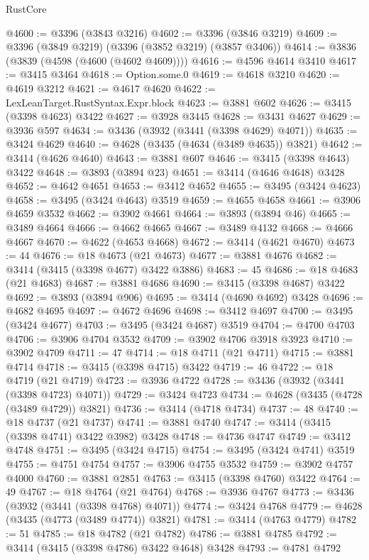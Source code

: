 \begin{lexlean}{RustCore}
\begin{coremodule}
@4600 := @3396 (@3843 @3216)
@4602 := @3396 (@3846 @3219)
@4609 := @3396 (@3849 @3219) (@3396 (@3852 @3219) (@3857 @3406))
@4614 := @3836 (@3839 (@4598 (@4600 (@4602 @4609))))
@4616 := @4596 @4614 @3410
@4617 := @3415 @3464
@4618 := Option.some.{0}
@4619 := @4618 @3210
@4620 := @4619 @3212
@4621 := @4617 @4620
@4622 := LexLeanTarget.RustSyntax.Expr.block
@4623 := @3881 @602
@4626 := @3415 (@3398 @4623) @3422
@4627 := @3928 @3445
@4628 := @3431 @4627
@4629 := @3936 @597
@4634 := @3436 (@3932 (@3441 (@3398 @4629) @4071))
@4635 := @3424 @4629
@4640 := @4628 (@3435 (@4634 (@3489 @4635)) @3821)
@4642 := @3414 (@4626 @4640)
@4643 := @3881 @607
@4646 := @3415 (@3398 @4643) @3422
@4648 := @3893 (@3894 @23)
@4651 := @3414 (@4646 @4648) @3428
@4652 := @4642 @4651
@4653 := @3412 @4652
@4655 := @3495 (@3424 @4623)
@4658 := @3495 (@3424 @4643) @3519
@4659 := @4655 @4658
@4661 := @3906 @4659 @3532
@4662 := @3902 @4661
@4664 := @3893 (@3894 @46)
@4665 := @3489 @4664
@4666 := @4662 @4665
@4667 := @3489 @4132
@4668 := @4666 @4667
@4670 := @4622 (@4653 @4668)
@4672 := @3414 (@4621 @4670)
@4673 := 44
@4676 := @18 @4673 (@21 @4673)
@4677 := @3881 @4676
@4682 := @3414 (@3415 (@3398 @4677) @3422 @3886)
@4683 := 45
@4686 := @18 @4683 (@21 @4683)
@4687 := @3881 @4686
@4690 := @3415 (@3398 @4687) @3422
@4692 := @3893 (@3894 @906)
@4695 := @3414 (@4690 @4692) @3428
@4696 := @4682 @4695
@4697 := @4672 @4696
@4698 := @3412 @4697
@4700 := @3495 (@3424 @4677)
@4703 := @3495 (@3424 @4687) @3519
@4704 := @4700 @4703
@4706 := @3906 @4704 @3532
@4709 := @3902 @4706 @3918 @3923
@4710 := @3902 @4709
@4711 := 47
@4714 := @18 @4711 (@21 @4711)
@4715 := @3881 @4714
@4718 := @3415 (@3398 @4715) @3422
@4719 := 46
@4722 := @18 @4719 (@21 @4719)
@4723 := @3936 @4722
@4728 := @3436 (@3932 (@3441 (@3398 @4723) @4071))
@4729 := @3424 @4723
@4734 := @4628 (@3435 (@4728 (@3489 @4729)) @3821)
@4736 := @3414 (@4718 @4734)
@4737 := 48
@4740 := @18 @4737 (@21 @4737)
@4741 := @3881 @4740
@4747 := @3414 (@3415 (@3398 @4741) @3422 @3982) @3428
@4748 := @4736 @4747
@4749 := @3412 @4748
@4751 := @3495 (@3424 @4715)
@4754 := @3495 (@3424 @4741) @3519
@4755 := @4751 @4754
@4757 := @3906 @4755 @3532
@4759 := @3902 @4757 @4000
@4760 := @3881 @2851
@4763 := @3415 (@3398 @4760) @3422
@4764 := 49
@4767 := @18 @4764 (@21 @4764)
@4768 := @3936 @4767
@4773 := @3436 (@3932 (@3441 (@3398 @4768) @4071))
@4774 := @3424 @4768
@4779 := @4628 (@3435 (@4773 (@3489 @4774)) @3821)
@4781 := @3414 (@4763 @4779)
@4782 := 51
@4785 := @18 @4782 (@21 @4782)
@4786 := @3881 @4785
@4792 := @3414 (@3415 (@3398 @4786) @3422 @4648) @3428
@4793 := @4781 @4792

\end{coremodule}
\end{lexlean}

